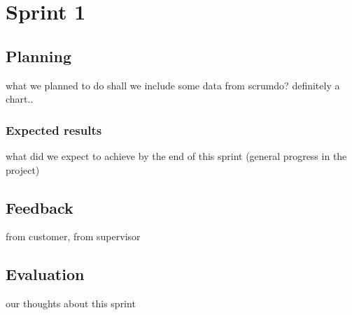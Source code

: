 
\chapter{Sprint 1} %

\label{Sprint 1} %


\section{Planning}
what we planned to do
shall we include some data from scrumdo? definitely a chart..
\subsection{Expected results}
what did we expect to achieve by the end of this sprint (general progress in the project)
\section{Feedback}
from customer, from supervisor
\section{Evaluation}
our thoughts about this sprint